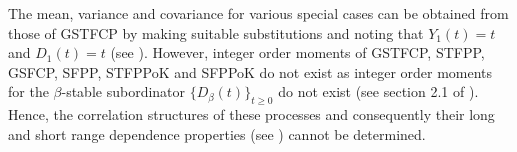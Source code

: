 \documentclass[11pt,oneside,reqno]{amsart}
\theoremstyle{definition}
\newtheorem{remark}{\bf Remark}[section]
\theoremstyle{remarkstyle}
\begin{document}
The mean, variance and covariance for various special cases can be obtained from those of GSTFCP by making suitable substitutions and noting that $Y_1(t)=t$ and $D_1(t)=t$ (see \citet{Maheshwari2019}). However, integer order moments of GSTFCP, STFPP, GSFCP, SFPP, STFPPoK and SFPPoK do not exist as integer order moments for the $\beta$-stable subordinator $\{D_\beta(t)\}_{t\geq 0}$ do not exist (see section 2.1 of \citet{KatariaTCSTFPP2022}). Hence, the correlation structures of these processes and consequently their long and short range dependence properties (see \citet{Maheshwari2019}) cannot be determined.
\end{document}
